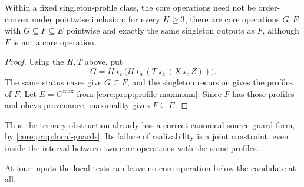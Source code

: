 \begin{corollary}\label{core:cor:profile-nonconvex}
Within a fixed singleton-profile class, the core operations need not be
order-convex under pointwise inclusion: for every $K\geq3$, there are
core operations $G,E$ with $G\subseteq F\subseteq E$ pointwise and exactly the same singleton
outputs as $F$, although $F$ is not a core operation.
\end{corollary}
\begin{proof}
Using the $H,T$ above, put
\[
 G=H\star_c\bigl(H\star_a(T\star_a(X\star_cZ))\bigr).
\]
The same status cases give $G\subseteq F$, and the singleton recursion
gives the profiles of $F$. Let $E=G^{\max}$ from
\cref{core:prop:profile-maximum}. Since $F$ has those profiles and
obeys provenance, maximality gives $F\subseteq E$.
\end{proof}

Thus the ternary obstruction already has a correct canonical source-guard
form, by \cref{core:prop:local-guards}. Its failure of realizability is a
joint constraint, even inside the interval between two core operations
with the same profiles.

At four inputs the local tests can leave no core operation below the
candidate at all.

